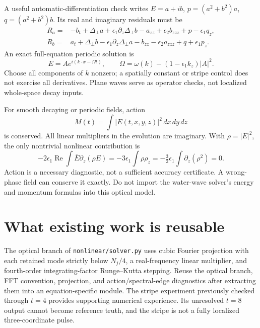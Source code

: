 \documentclass[11pt]{article}
\begin{document}
A useful automatic-differentiation check writes $E=a+ib$, $p=(a^2+b^2)a$, $q=(a^2+b^2)b$. Its real and imaginary residuals must be
\begin{align}
R_a={}&-b_t+\Delta_\perp a+\epsilon_1\partial_z\Delta_\perp b-a_{zz}
+\epsilon_2 b_{zzz}+p-\epsilon_1 q_z,\\
R_b={}&a_t+\Delta_\perp b-\epsilon_1\partial_z\Delta_\perp a-b_{zz}
-\epsilon_2 a_{zzz}+q+\epsilon_1 p_z.
\end{align}
An exact full-equation periodic solution is
\begin{equation}
E=Ae^{i(k\cdot x-\Omega t)},\qquad
\Omega=\omega(k)-(1-\epsilon_1k_z)|A|^2.
\end{equation}
Choose all components of $k$ nonzero; a spatially constant or stripe control does not exercise all derivatives. Plane waves serve as operator checks, not localized whole-space decay inputs.

For smooth decaying or periodic fields, action
\begin{equation}M(t)=\int |E(t,x,y,z)|^2\,dx\,dy\,dz\end{equation}
is conserved. All linear multipliers in the evolution are imaginary. With $\rho=|E|^2$, the only nontrivial nonlinear contribution is
\begin{equation}
-2\epsilon_1\operatorname{Re}\int\overline E\partial_z(\rho E)
=-3\epsilon_1\int\rho\rho_z
=-\tfrac32\epsilon_1\int\partial_z(\rho^2)=0.
\end{equation}
Action is a necessary diagnostic, not a sufficient accuracy certificate. A wrong-phase field can conserve it exactly. Do not import the water-wave solver's energy and momentum formulas into this optical model.

\section{What existing work is reusable}
The optical branch of \texttt{nonlinear/solver.py} uses cubic Fourier projection with each retained mode strictly below $N_j/4$, a real-frequency linear multiplier, and fourth-order integrating-factor Runge--Kutta stepping. Reuse the optical branch, FFT convention, projection, and action/spectral-edge diagnostics after extracting them into an equation-specific module. The stripe experiment previously checked through $t=4$ provides supporting numerical experience. Its unresolved $t=8$ output cannot become reference truth, and the stripe is not a fully localized three-coordinate pulse.
\end{document}
